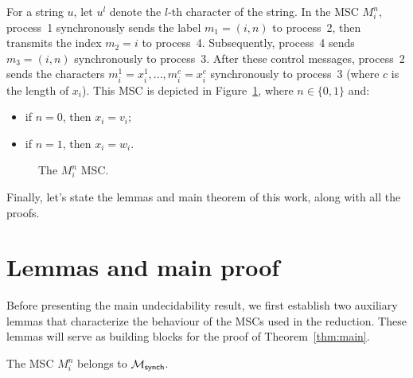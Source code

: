 \begin{definition}[$M^n_i$]\label{def:mni}
	For a string $u$, let $u^l$ denote the $l$-th character of the string.
	In the MSC $M^n_i$, process~1 synchronously sends the label
	$m_1 = (i, n)$ to process~2, then transmits the index $m_2=i$
	to process~4. Subsequently, process~4 sends $m_3 = (i, n)$
	synchronously to process~3. After these control messages, process~2
	sends the characters $m_i^1 = x_i^1,..., m_i^c = x_i^c$
	synchronously to process~3 (where $c$ is the length of $x_i$).
	This MSC is depicted in Figure~\ref{fig:mni}, where $n\in\{0,1\}$ and:
	\begin{itemize}
		\item if $n=0$, then $x_i=v_i$;
		\item if $n=1$, then $x_i=w_i$.
	\end{itemize}

	\begin{figure}[!ht]
		\centering
		\begin{msc}[draw frame=none, draw head=none, msc keyword=, head height=0px, label distance=0.5ex, foot height=0px, foot distance=0px]{}

		\end{msc}
		\caption{The $M_i^n$ MSC.}
		\label{fig:mni}
	\end{figure}

\end{definition}

Finally, let's state the lemmas and main theorem of this work, 
along with all the proofs. 

\section{Lemmas and main proof}

Before presenting the main undecidability result, we first establish two
auxiliary lemmas that characterize the behaviour of the MSCs used in the
reduction. These lemmas will serve as building blocks for the proof of
Theorem~\ref{thm:main}.

\bigskip

\begin{lemma}\label{lemma:minsynch}
	The MSC $M_i^n$ belongs to $\mathcal{M}_{\mathsf{synch}}$.
\end{lemma}

